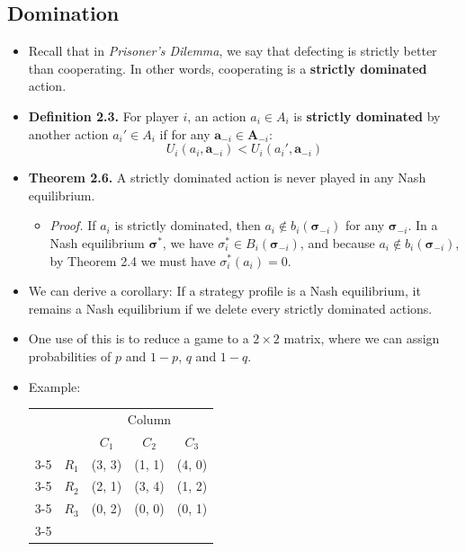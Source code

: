 \documentclass[notitlepage]{article}
\begin{document}
\subsection{Domination}

\begin{itemize}
    \item Recall that in \textit{Prisoner's Dilemma}, we say that defecting is strictly better than cooperating. In other words, cooperating is a \textbf{strictly dominated} action.
    \item \textbf{Definition 2.3.} For player \(i\), an action \(a_i \in A_i\) is \textbf{strictly dominated} by another action \(a_i' \in A_i\) if for any \(\mathbf{a}_{-i} \in \mathbf{A}_{-i}\):
    \[
    U_i(a_i, \mathbf{a}_{-i}) < U_i(a_i', \mathbf{a}_{-i})
    \]
    \item \textbf{Theorem 2.6.} A strictly dominated action is never played in any Nash equilibrium.
    \begin{itemize}
        \item \textit{Proof.} If \(a_i\) is strictly dominated, then \(a_i \notin b_i(\boldsymbol{\sigma}_{-i})\) for any \(\boldsymbol{\sigma}_{-i}\). In a Nash equilibrium \(\boldsymbol{\sigma}^*\), we have \(\sigma_i^* \in B_i(\boldsymbol{\sigma}_{-i})\), and because \(a_i \notin b_i(\boldsymbol{\sigma}_{-i})\), by Theorem 2.4 we must have \(\sigma_i^*(a_i) = 0\).
    \end{itemize}
    \item We can derive a corollary: If a strategy profile is a Nash equilibrium, it remains a Nash equilibrium if we delete every strictly dominated actions.
    \item One use of this is to reduce a game to a \(2 \times 2\) matrix, where we can assign probabilities of \(p\) and \(1-p\), \(q\) and \(1-q\).

    \item Example:
    
    \begin{table}[h]
    \begin{center}
    \begin{tabular}{llccc}
    &&
    \multicolumn{3}{c}{Column} \\&& 
    $C_1$ & 
    $C_2$ & 
    $C_3$
    \\ \cline{3-5} 
    \multirow{3}{*}{Row} & 
    \multicolumn{1}{c|}{$R_1$} & 
    \multicolumn{1}{c|}{(3, 3)} &
    \multicolumn{1}{c|}{(1, 1)} &
    \multicolumn{1}{c|}{(4, 0)}
    \\ \cline{3-5} & 
    \multicolumn{1}{c|}{$R_2$} & 
    \multicolumn{1}{c|}{(2, 1)} &
    \multicolumn{1}{c|}{(3, 4)} &
    \multicolumn{1}{c|}{(1, 2)}
    \\ \cline{3-5} & 
    \multicolumn{1}{c|}{$R_3$}& 
    \multicolumn{1}{c|}{(0, 2)} &
    \multicolumn{1}{c|}{(0, 0)} &
    \multicolumn{1}{c|}{(0, 1)}
    \\ \cline{3-5} 
    \end{tabular}
    \end{center}
    \end{table}
    

\end{itemize}
\end{document}
